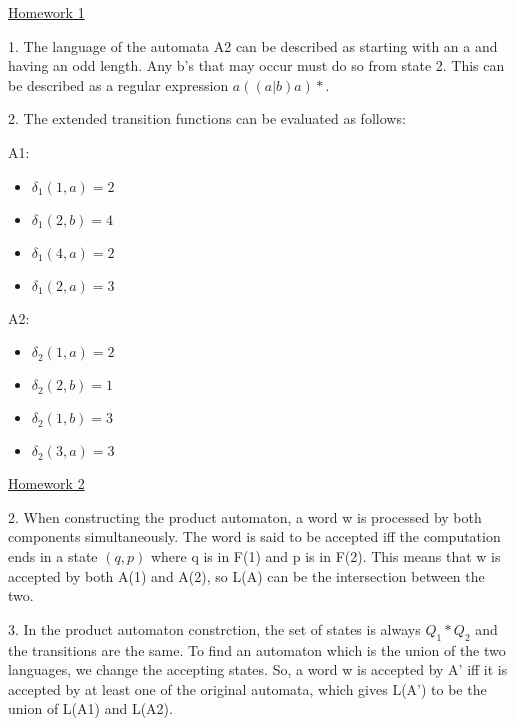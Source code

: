\documentclass{article}
\theoremstyle{theorem}
\theoremstyle{definition}
\theoremstyle{remark}
\begin{document}
\underline{Homework 1}

1. The language of the automata A2 can be described as starting with an a and having an odd length. Any b's that may occur must do so from state 2. This can be described as a regular expression $a((a|b)a)*$.

2. The extended transition functions can be evaluated as follows:

A1:
\begin{itemize}
  \item $\delta_1(1, a) = 2$
  \item $\delta_1(2, b) = 4$
  \item $\delta_1(4, a) = 2$
  \item $\delta_1(2, a) = 3$
\end{itemize}

A2:
\begin{itemize}
  \item $\delta_2(1, a) = 2$
  \item $\delta_2(2, b) = 1$
  \item $\delta_2(1, b) = 3$
  \item $\delta_2(3, a) = 3$
\end{itemize}

\underline{Homework 2}


2. When constructing the product automaton, a word w is processed by both components simultaneously. The word is said to be accepted iff the computation ends in a state $(q,p)$ where q is in F(1) and p is in F(2). This means that w is accepted by both A(1) and A(2), so L(A) can be the intersection between the two. 

3. In the product automaton constrction, the set of states is always $Q_1 * Q_2$ and the transitions are the same. To find an automaton which is the union of the two languages, we change the accepting states. So, a word w is accepted by A' iff it is accepted by at least one of the original automata, which gives L(A') to be the union of L(A1) and L(A2). 
\end{document}
